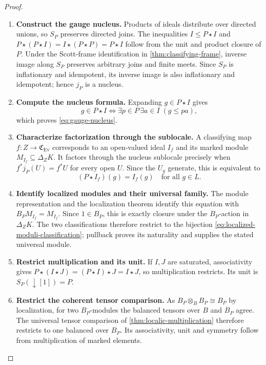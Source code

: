 \documentclass[11pt,a4paper]{article}
\numberwithin{algorithm}{section}
\numberwithin{equation}{section}
\theoremstyle{definition}
\theoremstyle{remark}
\theoremstyle{plain}
\newcommand{\Ev}{{\operatorname{Ev}}}
\newcommand{\Cplx}{\mathfrak C_{\Ev}}
\theoremstyle{definition}
\theoremstyle{plain}
\begin{document}
\begin{proof}\leavevmode
\begin{enumerate}[leftmargin=*,align=left]
\item \textbf{Construct the gauge nucleus.}
Products of ideals distribute over directed unions, so $S_P$
preserves directed joins.  The inequalities $I\le P\star I$ and
$P\star(P\star I)=I\star(P\star P)=P\star I$ follow from the
unit and product closure of $P$.  Under the Scott-frame
identification in \cref{thm:classifying-frame}, inverse image
along $S_P$ preserves arbitrary joins and finite meets.  Since
$S_P$ is inflationary and idempotent, its inverse image is also
inflationary and idempotent; hence $j_P$ is a nucleus.

\item \textbf{Compute the nucleus formula.}
Expanding $g\in P\star I$ gives
\[
 g\in P\star I\iff\exists p\in P\,\exists a\in I\;(g\le pa),
\]
which proves \eqref{eq:gauge-nucleus}.

\item \textbf{Characterize factorization through the sublocale.}
A classifying map $f:Z\to\Cplx$ corresponds to an open-valued
ideal $I_f$ and its marked module $M_{I_f}\subseteq\Delta_ZK$.
It factors through the nucleus sublocale precisely when
$f^*j_P(U)=f^*U$ for every open $U$.  Since the $U_g$ generate,
this is equivalent to
\[
 (P\star I_f)(g)=I_f(g)\quad\text{for all }g\in L.
\]

\item \textbf{Identify localized modules and their universal family.}
The module representation and the localization theorem identify
this equation with $B_PM_{I_f}=M_{I_f}$.  Since $1\in B_P$,
this is exactly closure under the $B_P$-action in $\Delta_ZK$.
The two classifications therefore restrict to the bijection
\eqref{eq:localized-moduli-classification}; pullback proves its
naturality and supplies the stated universal module.

\item \textbf{Restrict multiplication and its unit.}
If $I,J$ are saturated, associativity gives
$P\star(I\star J)=(P\star I)\star J=I\star J$, so
multiplication restricts.  Its unit is $S_P(\downarrow[1])=P$.

\item \textbf{Restrict the coherent tensor comparison.}
As $B_P\otimes_BB_P\cong B_P$ by localization, for two
$B_P$-modules the balanced tensors over $B$ and $B_P$ agree.
The universal tensor comparison of \cref{thm:localic-multiplication}
therefore restricts to one balanced over $B_P$.  Its associativity,
unit and symmetry follow from multiplication of marked elements.
\end{enumerate}
\end{proof}
\end{document}

